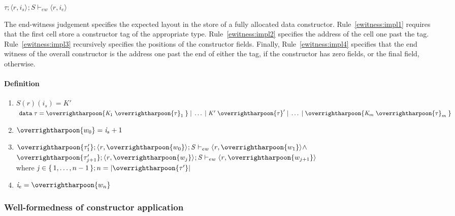 \documentclass[showabstract,showacknowledgments,showpreface,showdedication,school]{iuphd}
\theoremstyle{nonumberplain}
\newcommand{\keywd}[1]{\mathit{#1}}
\newcommand{\gramwd}[1]{\texttt{#1}}
\newcommand{\skeywd}[1]{\mathit{#1}}
\newcommand{\DC}{\keywd{K}}
\newcommand{\DATA}{\gramwd{data}}
\newcommand{\TYP}{\keywd{\tau}}
\newcommand{\sTYP}{\skeywd{\tau}}
\newcommand{\concreteloc}[3]{\ensuremath{\langle #1, #2 \rangle ^{#3}}}
\newcommand{\reg}{\skeywd{r}}
\newcommand{\ind}{\keywd{i}}
\newcommand{\indj}{\keywd{j}}
\newcommand{\STOR}{\keywd{S}}
\newcommand\set[1]{\{ \, \ensuremath{#1} \,\}}
\newcommand{\ewitness}[4]{\ensuremath{#1;#2;#3 \vdash_{ew} #4}}
\newcommand{\overharpoon}[1]{\overrightharpoon{#1}}
\begin{document}
$\ewitness{\TYP}{\concreteloc{\reg}{\ind_{s}}{}}{\STOR}{\concreteloc{\reg}{\ind_{e}}{}}$

The end-witness judgement specifies the expected layout in the store of a fully
allocated data constructor.
Rule~\ref{ewitness:impl1} requires that the first cell store a constructor
tag of the appropriate type.
Rule~\ref{ewitness:impl2} specifies the address of the cell one past the tag.
Rule~\ref{ewitness:impl3} recursively specifies the positions of the constructor
fields.
Finally, Rule~\ref{ewitness:impl4} specifies that the end witness of
the overall constructor is the address one past the end of either the
tag, if the constructor has zero fields, or the final field,
otherwise.

\paragraph{Definition}

\begin{enumerate}
\item \label{ewitness:impl1} $\STOR(\reg)(\ind_s) = \DC'$ \;  \\
      $\; \DATA\;\TYP = \overharpoon{\DC_1 \; \overharpoon{\sTYP}_1\;} \; | \; \ldots \; | \; \DC' \; \overharpoon{\sTYP}' \; | \; \ldots \; | \; \overharpoon{\DC_m \; \overharpoon{\sTYP}_m\;}$

\item \label{ewitness:impl4} $\overharpoon{w_0} = \ind_s + 1$

\item \label{ewitness:impl2}
  $\ewitness{\overharpoon{\TYP'_1}}{\concreteloc{\reg}{\overharpoon{w_0}}{}}{\STOR}{\concreteloc{\reg}{\overharpoon{w_1}}{}} \wedge$ \\
  $\ewitness{\overharpoon{\TYP'_{j+1}}}{\concreteloc{\reg}{\overharpoon{w_j}}{}}{\STOR}{\concreteloc{\reg}{\overharpoon{w_{j+1}}}{}}$
  \\ where $\indj \in \set{1,\ldots,n-1} ; n = | \overharpoon{\TYP'} |$

\item \label{ewitness:impl3}
  $\ind_e = \overharpoon{w_n}$
\end{enumerate}

\subsubsection{Well-formedness of constructor application}
\label{sec:well-formedness-constructors}
\end{document}
